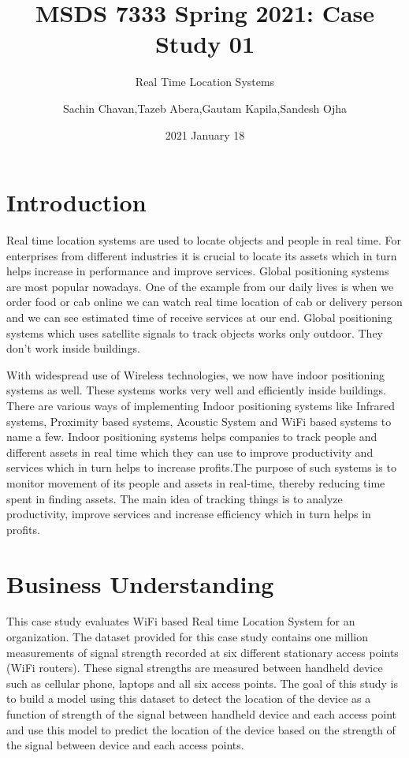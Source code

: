 \documentclass[
]{article}
\title{MSDS 7333 Spring 2021: Case Study 01}
\subtitle{Real Time Location Systems}
\author{Sachin Chavan,Tazeb Abera,Gautam Kapila,Sandesh Ojha}
\date{2021 January 18}
\begin{document}
\maketitle

\hypertarget{introduction}{%
\section{Introduction}\label{introduction}}

Real time location systems are used to locate objects and people in real
time. For enterprises from different industries it is crucial to locate
its assets which in turn helps increase in performance and improve
services. Global positioning systems are most popular nowadays. One of
the example from our daily lives is when we order food or cab online we
can watch real time location of cab or delivery person and we can see
estimated time of receive services at our end. Global positioning
systems which uses satellite signals to track objects works only
outdoor. They don't work inside buildings.

With widespread use of Wireless technologies, we now have indoor
positioning systems as well. These systems works very well and
efficiently inside buildings. There are various ways of implementing
Indoor positioning systems like Infrared systems, Proximity based
systems, Acoustic System and WiFi based systems to name a few. Indoor
positioning systems helps companies to track people and different assets
in real time which they can use to improve productivity and services
which in turn helps to increase profits.The purpose of such systems is
to monitor movement of its people and assets in real-time, thereby
reducing time spent in finding assets. The main idea of tracking things
is to analyze productivity, improve services and increase efficiency
which in turn helps in profits.

\hypertarget{business-understanding}{%
\section{Business Understanding}\label{business-understanding}}

This case study evaluates WiFi based Real time Location System for an
organization. The dataset provided for this case study contains one
million measurements of signal strength recorded at six different
stationary access points (WiFi routers). These signal strengths are
measured between handheld device such as cellular phone, laptops and all
six access points. The goal of this study is to build a model using this
dataset to detect the location of the device as a function of strength
of the signal between handheld device and each access point and use this
model to predict the location of the device based on the strength of the
signal between device and each access points.
\end{document}
